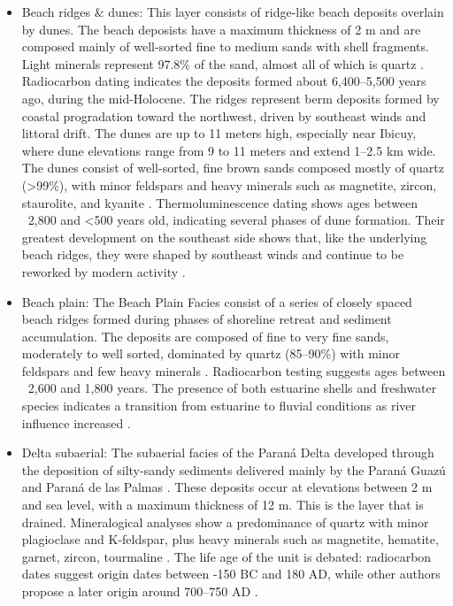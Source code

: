 \begin{itemize}
    \item Beach ridges \& dunes: This layer consists of ridge-like beach deposits overlain by dunes. The beach deposists have a maximum thickness of 2 m and are composed mainly of well-sorted fine to medium sands with shell fragments. Light minerals represent 97.8\% of the sand, almost all of which is quartz \autocite{cordiniContribucionConocimientoGeologia1949}. Radiocarbon dating indicates the deposits formed about 6,400–5,500 years ago, during the mid-Holocene. The ridges represent berm deposits formed by coastal progradation toward the northwest, driven by southeast winds and littoral drift.
    The dunes are up to 11 meters high, especially near Ibicuy, where dune elevations range from 9 to 11 meters and extend 1–2.5 km wide. The dunes consist of well-sorted, fine brown sands composed mostly of quartz (>99\%), with minor feldspars and heavy minerals such as magnetite, zircon, staurolite, and kyanite \autocite{cordiniContribucionConocimientoGeologia1949}. Thermoluminescence dating shows ages between ~2,800 and <500 years old, indicating several phases of dune formation. Their greatest development on the southeast side shows that, like the underlying beach ridges, they were shaped by southeast winds and continue to be reworked by modern activity \autocite{cavallottoEvolucionCambiosAmbientales2005}.

    \item Beach plain: The Beach Plain Facies consist of a series of closely spaced beach ridges formed during phases of shoreline retreat and sediment accumulation. The deposits are composed of fine to very fine sands, moderately to well sorted, dominated by quartz (85–90\%) with minor feldspars and few heavy minerals \autocite{cordiniContribucionConocimientoGeologia1949}. Radiocarbon testing suggests ages between ~2,600 and 1,800 years. The presence of both estuarine shells and freshwater species indicates a transition from estuarine to fluvial conditions as river influence increased \autocite{cavallottoEvolucionCambiosAmbientales2005}.

    \item Delta subaerial: The subaerial facies of the Paraná Delta developed through the deposition of silty-sandy sediments delivered mainly by the Paraná Guazú and Paraná de las Palmas \autocite{cavallottoEvolucionCambiosAmbientales2005}. These deposits occur at elevations between 2 m and sea level, with a maximum thickness of 12 m. This is the layer that is drained.
    Mineralogical analyses show a predominance of quartz with minor plagioclase and K-feldspar, plus heavy minerals such as magnetite, hematite, garnet, zircon, tourmaline \autocite{cavallottoEvolucionCambiosAmbientales2005}. The life age of the unit is debated: radiocarbon dates suggest origin dates between -150 BC and 180 AD, while other authors propose a later origin around 700–750 AD \autocite{cavallottoEvolucionCambiosAmbientales2005}.
    

\end{itemize}

